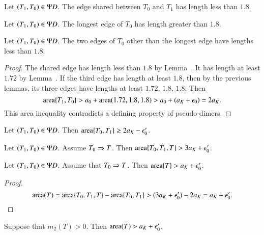 \begin{lemma}  
Let $(T_1,T_0)\in \Psi D$.  The edge shared between
$T_0$ and $T_1$ has length less than $1.8$. 
\end{lemma}

\begin{lemma} 
Let $(T_1,T_0)\in \Psi D$.  The longest edge of $T_0$
has length greater than $1.8$.
\end{lemma}

\begin{lemma}  
Let $(T_1,T_0)\in \Psi D$.  The two edges of $T_0$ other than the longest edge have lengths less
than $1.8$.
\end{lemma}

\begin{proof}
The shared edge has length less than $1.8$ by Lemma~.  
It has length at least $1.72$ by Lemma~.
If the third edge has length at
least $1.8$, then by the previous lemmas, its three edges have lengths at least $1.72$, $1.8$, $1.8$.
Then 
\[
{\operatorname{area}}\{T_1,T_0\} > a_0 + {\operatorname{area}}(1.72,1.8,1.8) > a_0 + (a_K + \epsilon_0) = 2a_K.
\]
This area inequality contradicts a defining property of pseudo-dimers.
\end{proof}

\begin{lemma}
Let $(T_1,T_0)\in\Psi D$.  Then ${\operatorname{area}}\{T_0,T_1\} \ge 2a_K - \epsilon_0'$.
\end{lemma}

\begin{lemma}
Let $(T_1,T_0)\in\Psi D$. Assume $T_0\Rightarrow T$.  Then ${\operatorname{area}}\{T_0,T_1,T\} > 3a_K + \epsilon_0'$.
\end{lemma}

\begin{corollary} 
Let $(T_1,T_0)\in\Psi D$.  Assume that $T_0\Rightarrow T$.  Then
${\operatorname{area}}\{T\} > a_K+\epsilon_0'$.
\end{corollary}

\begin{proof}  
\[
{\operatorname{area}}(T) = {\operatorname{area}}\{T_0,T_1,T\} - {\operatorname{area}}\{T_0,T_1\} > (3a_K + \epsilon_0') - 2a_K = a_K + \epsilon_0'.
\]
\end{proof}

\begin{corollary}
Suppose that $m_2(T)>0$.  Then ${\operatorname{area}}(T) > a_K + \epsilon_0'$.
\end{corollary}

